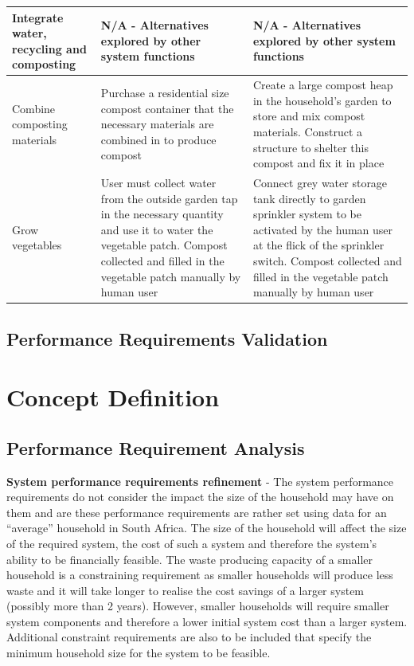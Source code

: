 \documentclass[a4paper,11pt,fleqn]{report}
\begin{document}
\begin{table}[h!]
\begin{center}
\begin{tabular}{p{3.5cm}|p{6cm}|p{6cm}}
    \hline
    Integrate water, recycling and composting & N/A - Alternatives explored by other system functions & N/A - Alternatives explored by other system functions\\
    \hline
     Combine composting materials & Purchase a residential size compost container that the necessary materials are combined in to produce compost & Create a large compost heap in the household's garden to store and mix compost materials. Construct a structure to shelter this compost and fix it in place\\
    \hline
     Grow vegetables & User must collect water from the outside garden tap in the necessary quantity and use it to water the vegetable patch. Compost collected and filled in the vegetable patch manually by human user & Connect grey water storage tank directly to garden sprinkler system to be activated by the human user at the flick of the sprinkler switch. Compost collected and filled in the vegetable patch manually by human user\\
    \hline
    \bottomrule
\end{tabular}
\end{center}
\end{table}
%
	
\subsection{Performance Requirements Validation}

\section{Concept Definition}
\subsection{Performance Requirement Analysis}
\textbf{System performance requirements refinement} - The system performance requirements do not consider the impact the size of the household may have on them and are these performance requirements are rather set using data for an “average” household in South Africa. The size of the household will affect the size of the required system, the cost of such a system and therefore the system’s ability to be financially feasible. The waste producing capacity of a smaller household is a constraining requirement as smaller households will produce less waste and it will take longer to realise the cost savings of a larger system (possibly more than 2 years). However, smaller households will require smaller system components and therefore a lower initial system cost than a larger system. Additional constraint requirements are also to be included that specify the minimum household size for the system to be feasible.
\end{document}
